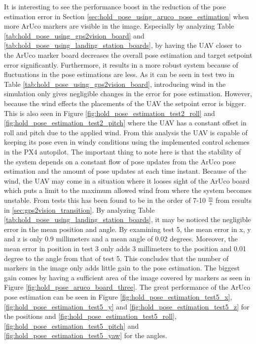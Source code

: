 \documentclass[../Head/report.tex]{subfiles}
\begin{document}
It is interesting to see the performance boost in the reduction of the pose estimation error in Section \ref{sec:hold_pose_using_aruco_pose_estimation} when more ArUco markers are visible in the image. Especially by analyzing Table \ref{tab:hold_pose_using_gps2vision_board} and \ref{tab:hold_pose_using_landing_station_boards}, by having the UAV closer to the ArUco marker board decreases the overall pose estimation and target setpoint error significantly. Furthermore, it results in a more robust system because of fluctuations in the pose estimations are less. As it can be seen in test two in Table \ref{tab:hold_pose_using_gps2vision_board}, introducing wind in the simulation only gives negligible changes in the error for pose estimation. However, because the wind effects the placements of the UAV the setpoint error is bigger. This is also seen in Figure \ref{fig:hold_pose_estimation_test2_roll} and \ref{fig:hold_pose_estimation_test2_pitch} where the UAV has a constant offset in roll and pitch due to the applied wind. From this analysis the UAV is capable of keeping its pose even in windy conditions using the implemented control schemes in the PX4 autopilot. The important thing to note here is that the stability of the system depends on a constant flow of pose updates from the ArUco pose estimation and the amount of pose updates at each time instant. Because of the wind, the UAV may come in a situation where it looses sight of the ArUco board which puts a limit to the maximum allowed wind from where the system becomes unstable. From tests this has been found to be in the order of 7-10 $\frac{m}{s}$ from results in \ref{sec:gps2vision_transition}. By analyzing Table \ref{tab:hold_pose_using_landing_station_boards}, it may be noticed the negligible error in the mean position and angle. By examining test 5, the mean error in x, y and z is only 0.9 millimeters and a mean angle of 0.02 degrees. Moreover, the mean error in position in test 3 only adds 3 millimeters to the position and 0.01 degree to the angle from that of test 5. This concludes that the number of markers in the image only adds little gain to the pose estimation. The biggest gain comes by having a sufficient area of the image covered by markers as seen in Figure \ref{fig:hold_pose_aruco_board_three}. The great performance of the ArUco pose estimation can be seen in Figure \ref{fig:hold_pose_estimation_test5_x}, \ref{fig:hold_pose_estimation_test5_y} and \ref{fig:hold_pose_estimation_test5_z} for the positions and \ref{fig:hold_pose_estimation_test5_roll}, \ref{fig:hold_pose_estimation_test5_pitch} and \ref{fig:hold_pose_estimation_test5_yaw} for the angles. 
\end{document}
